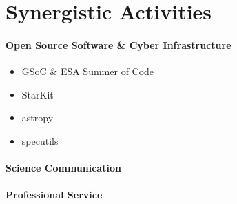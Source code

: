 \documentclass[10pt]{article}
\begin{document}
\section*{Synergistic Activities}
\paragraph{Open Source Software \& Cyber Infrastructure}
\begin{itemize}
    \item GSoC & ESA Summer of Code
    \item StarKit
    \item astropy
    \item specutils
\end{itemize}
\paragraph{Science Communication}
\paragraph{Professional Service}
\end{document}
